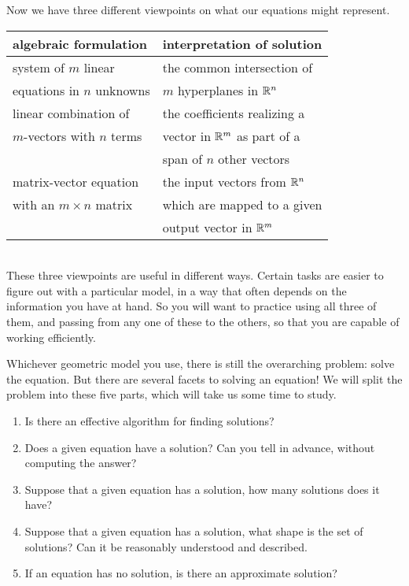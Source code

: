 \documentclass[00-livre-main.tex]{subfiles}
\begin{document}
Now we have three different viewpoints on what our equations might represent.\\

\begin{tabular}{l||l}
algebraic formulation & interpretation of solution\\
\hline
system of $m$ linear  & the common intersection of\\
equations in $n$ unknowns &  $m$  hyperplanes in $\mathbb{R}^n$ \\
\hline
linear combination of & the coefficients realizing a\\
$m$-vectors with $n$ terms & vector in $\mathbb{R}^m$ as part of a \\
& span of $n$ other vectors \\ 
\hline
matrix-vector equation & the input vectors from $\mathbb{R}^n$\\
with an $m\times n$ matrix &  which are mapped to a given\\
&  output vector in $\mathbb{R}^m$\\
\end{tabular}\\

These three viewpoints are useful in different ways. Certain tasks are easier to 
figure out with a particular model, in a way that often depends on the 
information you have at hand. So you will want to practice using all three of them, 
and passing from any one of these to the others, so that you are capable of 
working efficiently.

Whichever geometric model you use, there is still the overarching problem: solve the 
equation. But there are several facets to solving an equation! We will split the
problem into these five parts, which will take us some time to study.


\begin{enumerate}
	\item Is there an effective algorithm for finding solutions?
	\item Does a given equation have a solution? Can you tell in advance, without computing the answer?
	\item Suppose that a given equation has a solution, how many solutions does it have?
	\item Suppose that a given equation has a solution, what shape is the set of solutions? Can it be reasonably understood and described.
	\item If an equation has no solution, is there an approximate solution?	
\end{enumerate}
\end{document}
